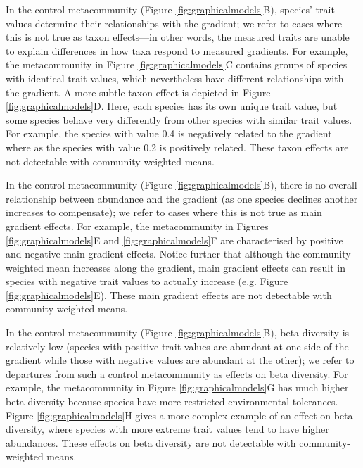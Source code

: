 \documentclass[12pt]{ecology}
\begin{document}
In the control metacommunity (Figure \ref{fig:graphicalmodels}B), species' trait values determine their relationships with the gradient; we refer to cases where this is not true as taxon effects---in other words, the measured traits are unable to explain differences in how taxa respond to measured gradients.  For example, the metacommunity in Figure \ref{fig:graphicalmodels}C contains groups of species with identical trait values, which nevertheless have different relationships with the gradient.  A more subtle taxon effect is depicted in Figure \ref{fig:graphicalmodels}D.  Here, each species has its own unique trait value, but some species behave very differently from other species with similar trait values.  For example, the species with value 0.4 is negatively related to the gradient where as the species with value 0.2 is positively related.  These taxon effects are not detectable with community-weighted means.

In the control metacommunity (Figure \ref{fig:graphicalmodels}B), there is no overall relationship between abundance and the gradient (as one species declines another increases to compensate); we refer to cases where this is not true as main gradient effects.  For example, the metacommunity in Figures \ref{fig:graphicalmodels}E and \ref{fig:graphicalmodels}F are characterised by positive and negative main gradient effects.  Notice further that although the community-weighted mean increases along the gradient, main gradient effects can result in species with negative trait values to actually increase (e.g. Figure \ref{fig:graphicalmodels}E).  These main gradient effects are not detectable with community-weighted means.

In the control metacommunity (Figure \ref{fig:graphicalmodels}B), beta diversity is relatively low (species with positive trait values are abundant at one side of the gradient while those with negative values are abundant at the other); we refer to departures from such a control metacommunity as effects on beta diversity.  For example, the metacommunity in Figure \ref{fig:graphicalmodels}G has much higher beta diversity because species have more restricted environmental tolerances.  Figure \ref{fig:graphicalmodels}H gives a more complex example of an effect on beta diversity, where species with more extreme trait values tend to have higher abundances.  These effects on beta diversity are not detectable with community-weighted means.
\end{document}
